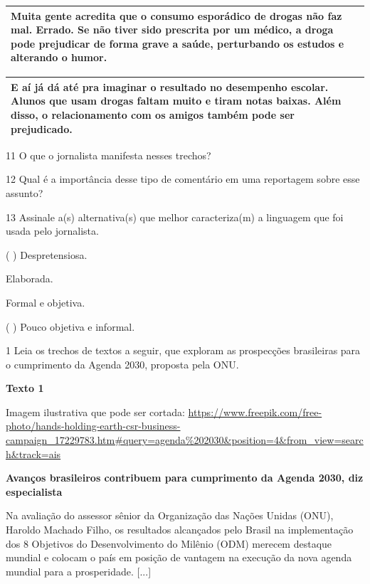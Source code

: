 \begin{itemize}
\begin{itemize}
{\begin{itemize}
\begin{itemize}
\begin{longtable}[]{@{}l@{}}
\toprule
Muita gente acredita que o consumo esporádico de drogas não faz mal.
Errado. Se não tiver sido prescrita por um médico, a droga pode
prejudicar de forma grave a saúde, perturbando os estudos e alterando o
humor.\tabularnewline
\bottomrule
\end{longtable}

\begin{longtable}[]{@{}l@{}}
\toprule
E aí já dá até pra imaginar o resultado no desempenho escolar. Alunos
que usam drogas faltam muito e tiram notas baixas. Além disso, o
relacionamento com os amigos também pode ser prejudicado.\tabularnewline
\bottomrule
\end{longtable}

\num{11} O que o jornalista manifesta nesses trechos? 

\num{12} Qual é a importância desse tipo de comentário em uma reportagem
sobre esse assunto? 

\num{13} Assinale a(s) alternativa(s) que melhor caracteriza(m) a
linguagem que foi usada pelo jornalista.

( ) Despretensiosa.

 Elaborada.

 Formal e objetiva.

( ) Pouco objetiva e informal.


\num{1} Leia os trechos de textos a seguir, que exploram as prospecções
brasileiras para o cumprimento da Agenda 2030, proposta pela ONU.

\textbf{Texto 1}

Imagem ilustrativa que pode ser cortada:
\url{https://www.freepik.com/free-photo/hands-holding-earth-csr-business-campaign_17229783.htm\#query=agenda\%202030\&position=4\&from_view=search\&track=ais}

\textbf{Avanços brasileiros contribuem para cumprimento da Agenda 2030,
diz especialista}

Na avaliação do assessor sênior da Organização das Nações Unidas (ONU),
Haroldo Machado Filho, os resultados alcançados pelo Brasil na
implementação dos 8 Objetivos do Desenvolvimento do Milênio (ODM)
merecem destaque mundial e colocam o país em posição de vantagem na
execução da nova agenda mundial para a prosperidade. {[}...{]}


\end{itemize}
\end{itemize}}
\end{itemize}
\end{itemize}
